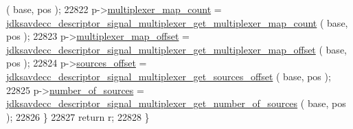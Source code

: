 \begin{DoxyCode}
      ( base, pos );
22822         p->\hyperlink{structjdksavdecc__descriptor__signal__multiplexer_a8c745eab00eb9dc3d107fc00233fd861}{multiplexer\_map\_count} = 
      \hyperlink{group__descriptor__signal__multiplexer_ga0d364a358d972265a34951f0e8984c58}{jdksavdecc\_descriptor\_signal\_multiplexer\_get\_multiplexer\_map\_count}
      ( base, pos );
22823         p->\hyperlink{structjdksavdecc__descriptor__signal__multiplexer_a2087871da25af7c05f775543cc959969}{multiplexer\_map\_offset} = 
      \hyperlink{group__descriptor__signal__multiplexer_ga4cf4bc8346925c5726cec4b48a0a6b2b}{jdksavdecc\_descriptor\_signal\_multiplexer\_get\_multiplexer\_map\_offset}
      ( base, pos );
22824         p->\hyperlink{structjdksavdecc__descriptor__signal__multiplexer_ac9ce4e1b642e6654d49504898dbe738d}{sources\_offset} = 
      \hyperlink{group__descriptor__signal__multiplexer_ga51bcc2d90939209a047281719ad75fc6}{jdksavdecc\_descriptor\_signal\_multiplexer\_get\_sources\_offset}
      ( base, pos );
22825         p->\hyperlink{structjdksavdecc__descriptor__signal__multiplexer_a1af3a7f3729937d5da218737ba5b2483}{number\_of\_sources} = 
      \hyperlink{group__descriptor__signal__multiplexer_gaad4fb03f065acf2e905c3d1f5b3b2ee2}{jdksavdecc\_descriptor\_signal\_multiplexer\_get\_number\_of\_sources}
      ( base, pos );
22826     \}
22827     \textcolor{keywordflow}{return} r;
22828 \}
\end{DoxyCode}


